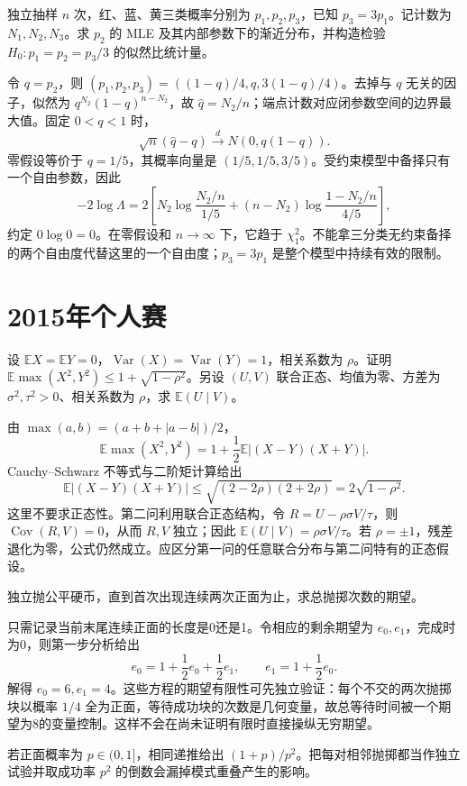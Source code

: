 \documentclass[UTF8,12pt,a4paper,fontset=fandol]{ctexbook}
\newcommand{\E}{\mathbb E}
\DeclareMathOperator{\Var}{Var}
\DeclareMathOperator{\Cov}{Cov}
\begin{document}
\begin{example}[原题5：受约束多项分布中的估计与检验]\label{yau:2014-5}
独立抽样 $n$ 次，红、蓝、黄三类概率分别为 $p_1,p_2,p_3$，已知 $p_3=3p_1$。记计数为 $N_1,N_2,N_3$。求 $p_2$ 的 MLE 及其内部参数下的渐近分布，并构造检验 $H_0:p_1=p_2=p_3/3$ 的似然比统计量。
\end{example}
\begin{solve}
令 $q=p_2$，则 $(p_1,p_2,p_3)=((1-q)/4,q,3(1-q)/4)$。去掉与 $q$ 无关的因子，似然为 $q^{N_2}(1-q)^{n-N_2}$，故 $\widehat q=N_2/n$；端点计数对应闭参数空间的边界最大值。固定 $0<q<1$ 时，
\[
\sqrt n(\widehat q-q)\xrightarrow dN(0,q(1-q)).
\]
零假设等价于 $q=1/5$，其概率向量是 $(1/5,1/5,3/5)$。受约束模型中备择只有一个自由参数，因此
\[
-2\log\Lambda=2\left[N_2\log\frac{N_2/n}{1/5}+(n-N_2)\log\frac{1-N_2/n}{4/5}\right],
\]
约定 $0\log0=0$。在零假设和 $n\to\infty$ 下，它趋于 $\chi^2_1$。不能拿三分类无约束备择的两个自由度代替这里的一个自由度；$p_3=3p_1$ 是整个模型中持续有效的限制。
\end{solve}


\section{2015年个人赛}
\begin{example}[原题1：二次矩的最大值与正态回归]\label{yau:2015-1}
设 $\E X=\E Y=0$，$\Var(X)=\Var(Y)=1$，相关系数为 $\rho$。证明 $\E\max(X^2,Y^2)\le1+\sqrt{1-\rho^2}$。另设 $(U,V)$ 联合正态、均值为零、方差为 $\sigma^2,\tau^2>0$、相关系数为 $\rho$，求 $\E(U\mid V)$。
\end{example}
\begin{solve}
由 $\max(a,b)=(a+b+|a-b|)/2$，
\[
\E\max(X^2,Y^2)=1+\frac12\E|(X-Y)(X+Y)|.
\]
Cauchy--Schwarz 不等式与二阶矩计算给出
\[
\E|(X-Y)(X+Y)|\le\sqrt{(2-2\rho)(2+2\rho)}=2\sqrt{1-\rho^2}.
\]
这里不要求正态性。第二问利用联合正态结构，令 $R=U-\rho\sigma V/\tau$，则 $\Cov(R,V)=0$，从而 $R,V$ 独立；因此 $\E(U\mid V)=\rho\sigma V/\tau$。若 $\rho=\pm1$，残差退化为零，公式仍然成立。应区分第一问的任意联合分布与第二问特有的正态假设。
\end{solve}

\begin{example}[原题2：连续两次正面的等待时间]\label{yau:2015-2}
独立抛公平硬币，直到首次出现连续两次正面为止，求总抛掷次数的期望。
\end{example}
\begin{solve}
只需记录当前末尾连续正面的长度是0还是1。令相应的剩余期望为 $e_0,e_1$，完成时为0，则第一步分析给出
\[
e_0=1+\frac12e_0+\frac12e_1,\qquad e_1=1+\frac12e_0.
\]
解得 $e_0=6,e_1=4$。这些方程的期望有限性可先独立验证：每个不交的两次抛掷块以概率 $1/4$ 全为正面，等待成功块的次数是几何变量，故总等待时间被一个期望为8的变量控制。这样不会在尚未证明有限时直接操纵无穷期望。

若正面概率为 $p\in(0,1]$，相同递推给出 $(1+p)/p^2$。把每对相邻抛掷都当作独立试验并取成功率 $p^2$ 的倒数会漏掉模式重叠产生的影响。
\end{solve}
\end{document}
